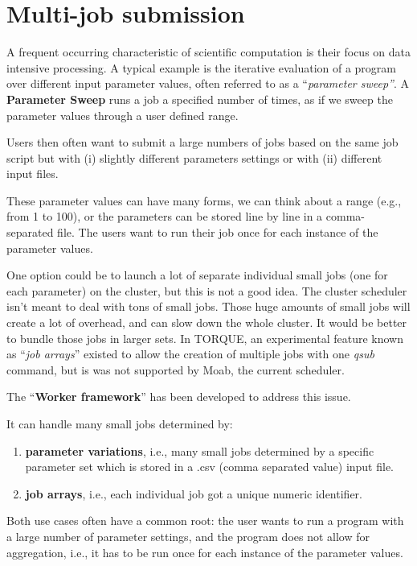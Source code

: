 \chapter{Multi-job submission}

A frequent occurring characteristic of scientific computation is their focus on data intensive processing. A typical example is the iterative evaluation of a program over different input parameter values, often referred to as a ``\textit{parameter sweep''}.  A \textbf{Parameter Sweep} runs a job a specified number of times, as if we sweep the parameter values through a user defined range.

Users then often want to submit a large numbers of jobs based on the same job script but with (i) slightly different parameters settings or with (ii) different input files.

These parameter values can have many forms, we can think about a range (e.g., from 1 to 100), or the parameters can be stored line by line in a comma-separated file. The users want to run their job once for each instance of the parameter values.

One option could be to launch a lot of separate individual small jobs (one for each parameter) on the cluster, but this is not a good idea. The cluster scheduler isn't meant to deal with tons of small jobs. Those huge amounts of small jobs will create a lot of overhead, and can slow down the whole cluster. It would be better to bundle those jobs in larger sets.  In TORQUE, an experimental feature known as ``\textit{job arrays}'' existed to allow the creation of multiple jobs with one \textit{qsub} command, but is was not supported by Moab, the current scheduler.

The ``\textbf{Worker framework}'' has been developed to address this issue.

It can handle many small jobs determined by:

\begin{enumerate}
\item  \textbf{parameter variations}, i.e., many small jobs determined by a specific parameter set which is stored in a .csv (comma separated value) input file.
\item  \textbf{job arrays}, i.e., each individual job got a unique numeric identifier.
\end{enumerate}

Both use cases often have a common root: the user wants to run a program with a large number of parameter settings, and the program does not allow for aggregation, i.e., it has to be run once for each instance of the parameter values.

